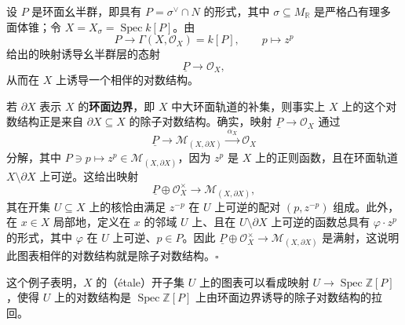 
\begin{example}
设 $P$ 是环面幺半群，即具有 $P=\sigma^{\vee}\cap N$ 的形式，其中 $\sigma\subseteq M_{\mathbb{R}}$ 是严格凸有理多面体锥；令 $X=X_{\sigma}=\operatorname{Spec} k[P]$。由
\[
  P\longrightarrow\Gamma(X,\mathcal{O}_X)=k[P],\qquad p\longmapsto z^p
\]
给出的映射诱导幺半群层的态射
\[
  \underline{P}\longrightarrow\mathcal{O}_X,
\]
从而在 $X$ 上诱导一个相伴的对数结构。

若 $\partial X$ 表示 $X$ 的\textbf{环面边界}，即 $X$ 中大环面轨道的补集，则事实上 $X$ 上的这个对数结构正是来自 $\partial X\subseteq X$ 的除子对数结构。确实，映射 $\underline{P}\to\mathcal{O}_X$ 通过
\[
  \underline{P}\longrightarrow\mathcal{M}_{(X,\partial X)}
  \xrightarrow{\ \alpha_X\ }\mathcal{O}_X
\]
分解，其中 $P\ni p\mapsto z^p\in\mathcal{M}_{(X,\partial X)}$，因为 $z^p$ 是 $X$ 上的正则函数，且在环面轨道 $X\setminus\partial X$ 上可逆。这给出映射
\[
  \underline{P}\oplus\mathcal{O}_X^{\times}\longrightarrow\mathcal{M}_{(X,\partial X)},
\]
其在开集 $U\subseteq X$ 上的核恰由满足 $z^{-p}$ 在 $U$ 上可逆的配对 $(p,z^{-p})$ 组成。此外，在 $x\in X$ 局部地，定义在 $x$ 的邻域 $U$ 上、且在 $U\setminus\partial X$ 上可逆的函数总具有 $\varphi\cdot z^p$ 的形式，其中 $\varphi$ 在 $U$ 上可逆、$p\in P$。因此 $\underline{P}\oplus\mathcal{O}_X^{\times}\to\mathcal{M}_{(X,\partial X)}$ 是满射，这说明此图表相伴的对数结构就是除子对数结构。\hfill$\square$
\end{example}

这个例子表明，$X$ 的（étale）开子集 $U$ 上的图表可以看成映射 $U\to\operatorname{Spec}\mathbb{Z}[P]$，使得 $U$ 上的对数结构是 $\operatorname{Spec}\mathbb{Z}[P]$ 上由环面边界诱导的除子对数结构的拉回。

